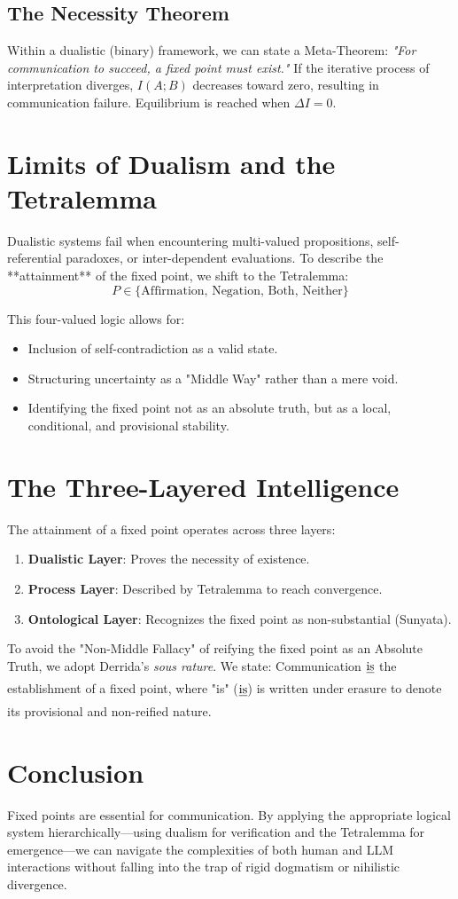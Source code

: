 \documentclass[11pt,a4paper]{article}
\newcommand{\isMW}{\sout{\text{is}}}
\begin{document}
\subsection{The Necessity Theorem}
Within a dualistic (binary) framework, we can state a Meta-Theorem: 
\textit{"For communication to succeed, a fixed point must exist."}
If the iterative process of interpretation diverges, $I(A;B)$ decreases toward zero, resulting in communication failure. Equilibrium is reached when $\Delta I = 0$.

\section{Limits of Dualism and the Tetralemma}
Dualistic systems fail when encountering multi-valued propositions, self-referential paradoxes, or inter-dependent evaluations. To describe the **attainment** of the fixed point, we shift to the Tetralemma:
\[ P \in \{\text{Affirmation, Negation, Both, Neither}\} \]

This four-valued logic allows for:
\begin{itemize}
    \item Inclusion of self-contradiction as a valid state.
    \item Structuring uncertainty as a "Middle Way" rather than a mere void.
    \item Identifying the fixed point not as an absolute truth, but as a local, conditional, and provisional stability.
\end{itemize}

\section{The Three-Layered Intelligence}
The attainment of a fixed point operates across three layers:
\begin{enumerate}
    \item \textbf{Dualistic Layer}: Proves the necessity of existence.
    \item \textbf{Process Layer}: Described by Tetralemma to reach convergence.
    \item \textbf{Ontological Layer}: Recognizes the fixed point as non-substantial (Sunyata).
\end{enumerate}

To avoid the "Non-Middle Fallacy" of reifying the fixed point as an Absolute Truth, we adopt Derrida's \textit{sous rature}. We state: Communication $\isMW$ the establishment of a fixed point, where "is" ($\isMW$) is written under erasure to denote its provisional and non-reified nature.

\section{Conclusion}
Fixed points are essential for communication. By applying the appropriate logical system hierarchically—using dualism for verification and the Tetralemma for emergence—we can navigate the complexities of both human and LLM interactions without falling into the trap of rigid dogmatism or nihilistic divergence.
\end{document}

